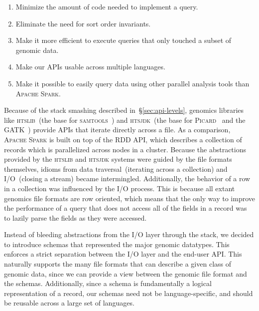 \documentclass[phd]{ucbthesis}
\begin{document}
\begin{enumerate}
\item Minimize the amount of code needed to implement a query.
\item Eliminate the need for sort order invariants.
\item Make it more efficient to execute queries that only touched a subset of
  genomic data.
\item Make our APIs usable across multiple languages.
\item Make it possible to easily query data using other parallel analysis tools
  than \textsc{Apache Spark}.
\end{enumerate}

Because of the stack smashing described in~\S\ref{sec:api-levels}, genomics
libraries like \textsc{htslib}~(the base for \textsc{samtools}~\cite{li09}) and
\textsc{htsjdk}~(the base for \textsc{Picard}~\cite{picard} and the
\textsc{GATK}~\cite{mckenna10}) provide APIs that iterate directly across a
file. As a comparison, \textsc{Apache Spark} is built on top of the RDD API,
which describes a collection of records which is parallelized across nodes in a
cluster. Because the abstractions provided by the \textsc{htslib} and
\textsc{htsjdk} systems were guided by the file formats themselves, idioms from
data traversal~(iterating across a collection) and I/O~(closing a stream) became
intermingled. Additionally, the behavior of a row in a collection was influenced
by the I/O process. This is because all extant genomics file formats are row
oriented, which means that the only way to improve the performance of a query
that does not access all of the fields in a record was to lazily parse the
fields as they were accessed.

Instead of bleeding abstractions from the I/O layer through the stack, we
decided to introduce schemas that represented the major genomic datatypes. This
enforces a strict separation between the I/O layer and the end-user API. This
naturally supports the many file formats that can describe a given class of
genomic data, since we can provide a view between the genomic file format and
the schemas. Additionally, since a schema is fundamentally a logical
representation of a record, our schemas need not be language-specific, and
should be reusable across a large set of languages.
\end{document}
